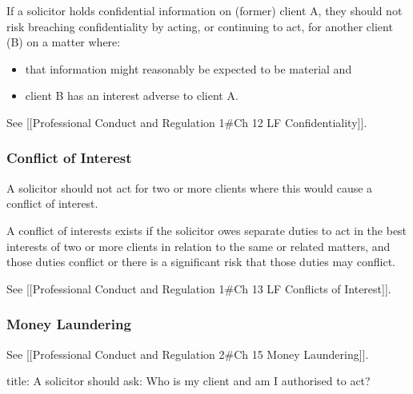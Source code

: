 \documentclass[
]{article}
\newenvironment{Shaded}{}{}
\newcommand{\NormalTok}[1]{#1}
\providecommand{\tightlist}{%
  \setlength{\itemsep}{0pt}\setlength{\parskip}{0pt}}
\begin{document}
If a solicitor holds confidential information on (former) client A, they
should not risk breaching confidentiality by acting, or continuing to
act, for another client (B) on a matter where:

\begin{itemize}
\tightlist
\item
  that information might reasonably be expected to be material and
\item
  client B has an interest adverse to client A.
\end{itemize}

See {[}{[}Professional Conduct and Regulation 1\#Ch 12 LF
Confidentiality{]}{]}.

\hypertarget{conflict-of-interest}{%
\subsubsection{Conflict of Interest}\label{conflict-of-interest}}

A solicitor should not act for two or more clients where this would
cause a conflict of interest.

\begin{Shaded}
\begin{Highlighting}[]
\NormalTok{A conflict of interests exists if the}
\NormalTok{solicitor owes separate duties to act in the best interests of two or more clients in relation to the same or related matters, and those duties conflict or there is a significant risk that those duties may conflict.}
\end{Highlighting}
\end{Shaded}

See {[}{[}Professional Conduct and Regulation 1\#Ch 13 LF Conflicts of
Interest{]}{]}.

\hypertarget{money-laundering}{%
\subsubsection{Money Laundering}\label{money-laundering}}

See {[}{[}Professional Conduct and Regulation 2\#Ch 15 Money
Laundering{]}{]}.

\begin{Shaded}
\begin{Highlighting}[]
\NormalTok{title: A solicitor should ask: }
\NormalTok{Who is my client and am I authorised to act?}
\end{Highlighting}
\end{Shaded}
\end{document}
